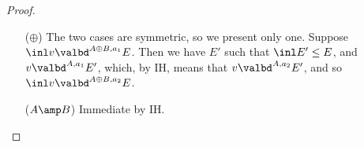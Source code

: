 \begin{proof}
\begin{enumerate}
\begin{itemize}
    \item[($\oplus$)] The two cases are symmetric, so we present only one. Suppose $\inl v \valbd^{A \oplus B,a_1} E$. Then we have $E'$ such that $\inl E' \leq E$, and $v \valbd^{A,a_1} E'$, which, by IH, means that $v \valbd^{A,a_2} E'$, and so $\inl v \valbd^{A \oplus B,a_2} E$.
    \item[($A \amp B$)] Immediate by IH.
  \end{itemize}
  \end{enumerate}
\end{proof}

